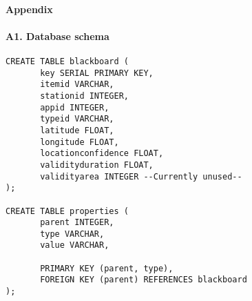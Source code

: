 \paragraph{Appendix}

\paragraph{A1. Database schema}
\begin{verbatim}
CREATE TABLE blackboard (
       key SERIAL PRIMARY KEY,
       itemid VARCHAR,
       stationid INTEGER,
       appid INTEGER,
       typeid VARCHAR,
       latitude FLOAT,
       longitude FLOAT,
       locationconfidence FLOAT,
       validityduration FLOAT,
       validityarea INTEGER --Currently unused--                                              
);

CREATE TABLE properties (
       parent INTEGER,
       type VARCHAR,
       value VARCHAR,

       PRIMARY KEY (parent, type),
       FOREIGN KEY (parent) REFERENCES blackboard
);
\end{verbatim}

\newpage
